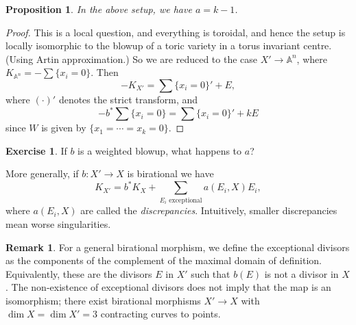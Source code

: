 \documentclass{article}
\newtheorem*{proposition}{Proposition}
\theoremstyle{definition}
\newtheorem*{remark}{Remark}
\newtheorem*{exercise}{Exercise}
\newcommand{\A}{\mathbb{A}}
\begin{document}
\begin{proposition}
    In the above setup, we have $a=k-1$.
\end{proposition}

\begin{proof}
    This is a local question, and everything is toroidal, and hence the setup is
    locally isomorphic to the blowup of a toric variety in a torus invariant
    centre. (Using Artin approximation.) So we are reduced to the case
    $X'\to\A^n$, where $K_{\A^n}=-\sum\{x_i=0\}$. Then
    \begin{equation*}
        -K_{X'} = \sum\{x_i=0\}' + E,
    \end{equation*}
    where $(\cdot)'$ denotes the strict transform, and
    \begin{equation*}
        -b^*\sum\{x_i=0\} = \sum\{x_i=0\}' + kE
    \end{equation*}
    since $W$ is given by $\{x_1=\cdots=x_k=0\}$.
\end{proof}

\begin{exercise}
    If $b$ is a weighted blowup, what happens to $a$?
\end{exercise}

More generally, if $b:X'\to X$ is birational we have
\begin{equation*}
    K_{X'} = b^*K_X + \sum_{\text{$E_i$ exceptional}}a(E_i,X)E_i,
\end{equation*}
where $a(E_i,X)$ are called the \emph{discrepancies}. Intuitively, smaller
discrepancies mean worse singularities.

\begin{remark}
    For a general birational morphism, we define the exceptional divisors as the
    components of the complement of the maximal domain of definition.
    Equivalently, these are the divisors $E$ in $X'$ such that $b(E)$ is not a
    divisor in $X$. The non-existence of exceptional divisors does not imply
    that the map is an isomorphism; there exist birational morphisms $X'\to X$
    with $\dim X=\dim X'=3$ contracting curves to points.
\end{remark}
\end{document}
